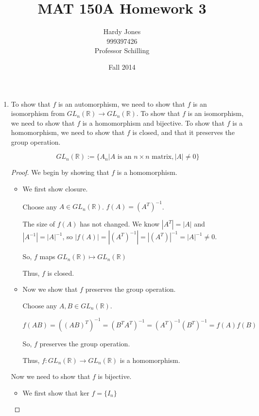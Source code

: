 \documentclass[12pt,letterpaper]{article}
\title{MAT 150A Homework 3\vspace{-2ex}}
\author{Hardy Jones\\
        999397426\\
        Professor Schilling\vspace{-2ex}}
\date{Fall 2014}
\newcommand{\GLNR}[0]{GL_n(\mathbb{R})}
\begin{document}
  \maketitle

  \begin{enumerate}
    \item
      To show that $f$ is an automorphism,
      we need to show that $f$ is an isomorphism from $\GLNR \rightarrow \GLNR$.
      To show that $f$ is an isomorphism,
      we need to show that $f$ is a homomorphism and bijective.
      To show that $f$ is a homomorphism,
      we need to show that $f$ is closed, and that it preserves the group operation.

      \[
        \GLNR := \{A_n | A \text{ is an } n \times n \text{ matrix}, |A| \ne 0\}
      \]

      \begin{proof}
        We begin by showing that $f$ is a homomorphism.

        \begin{itemize}
          \item
            We first show closure.

            Choose any $A \in \GLNR$.
            $f(A) = (A^T)^{-1}$.

            The size of $f(A)$ has not changed.
            We know $|A^T| = |A|$ and $|A^{-1}| = |A|^{-1}$,
            so $|f(A)| = |(A^T)^{-1}| = |(A^T)|^{-1} = |A|^{-1} \ne 0$.

            So, $f$ maps $\GLNR \mapsto \GLNR$

            Thus, $f$ is closed.

          \item
            Now we show that $f$ preserves the group operation.

            Choose any $A, B \in \GLNR$.

            \[
              f(AB) = ((AB)^T)^{-1} = (B^TA^T)^{-1} = (A^T)^{-1}(B^T)^{-1} = f(A)f(B)
            \]

            So, $f$ preserves the group operation.

            Thus, $f : \GLNR \rightarrow \GLNR$ is a homomorphism.
        \end{itemize}

        Now we need to show that $f$ is bijective.

        \begin{itemize}
          \item
            We first show that $\text{ker } f = \{I_n\}$


\end{itemize}
\end{proof}
\end{enumerate}
\end{document}
